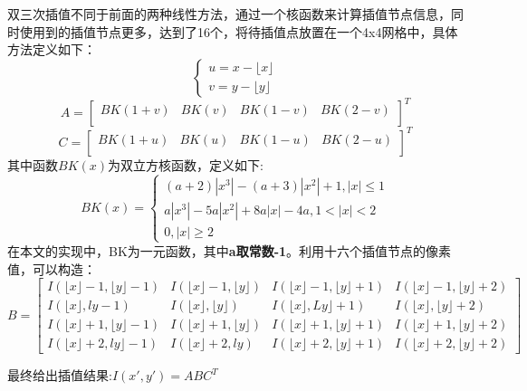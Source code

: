 \documentclass[UTF8]{ctexart}
\begin{document}
\begin{itemize}
    双三次插值不同于前面的两种线性方法，通过一个核函数来计算插值节点信息，同时使用到的插值节点更多，达到了16个，将待插值点放置在一个4x4网格中，具体方法定义如下：
    \begin{equation}
        \begin{cases}
            u=x-\lfloor x\rfloor\\
            v=y-\lfloor y\rfloor
        \end{cases}
    \end{equation}
    \begin{equation}
        A = \left[
        \begin{matrix}
            BK(1+v) & BK(v) & BK(1-v) & BK(2-v)\\
        \end{matrix}    
        \right]^T
    \end{equation}
    \begin{equation}
        C = \left[
        \begin{matrix}
            BK(1+u) & BK(u) & BK(1-u) & BK(2-u)\\
        \end{matrix}    
        \right]^T        
    \end{equation}
    其中函数$BK(x)$为双立方核函数，定义如下:
    \begin{equation}
        BK(x)=\begin{cases}
            (a+2)|x^3|-(a+3)|x^2|+1, |x|\leq 1\\
            a|x^3|-5a|x^2|+8a|x|-4a, 1<|x|<2\\
            0, |x|\geq 2
        \end{cases}
    \end{equation}
在本文的实现中，BK为一元函数，其中\textbf{a取常数-1}。利用十六个插值节点的像素值，可以构造：
$$
    B=\left[\begin{array}{cccc}{I(\lfloor x\rfloor- 1,\lfloor y\rfloor- 1)} & {I(\lfloor x\rfloor- 1,\lfloor y\rfloor)} & {I(\lfloor x\rfloor- 1,\lfloor y\rfloor+ 1)} & {I(\lfloor x\rfloor- 1,\lfloor y\rfloor+ 2)} \\ {I(\lfloor x\rfloor, l y-1)} & {I(\lfloor x\rfloor, \lfloor y\rfloor)} & {I(\lfloor x\rfloor, L y\rfloor+ 1)} & {I(\lfloor x\rfloor,\lfloor y\rfloor+ 2)} \\ {I(\lfloor x\rfloor+ 1,\lfloor y\rfloor- 1)} & {I(\lfloor x\rfloor+ 1,\lfloor y\rfloor)} & {I(\lfloor x\rfloor+ 1,\lfloor y\rfloor+ 1)} & {I(\lfloor x\rfloor+ 1, \lfloor y\rfloor+ 2)} \\ {I(\lfloor x\rfloor+ 2, l y\rfloor- 1)} & {I(\lfloor x\rfloor+ 2, l y)} & {I(\lfloor x\rfloor+ 2,\lfloor y\rfloor+ 1)} & {I(\lfloor x\rfloor+ 2,\lfloor y\rfloor+ 2)}\end{array}\right]
$$

最终给出插值结果:$I(x',y')=ABC^T$
\end{itemize}
\end{document}
